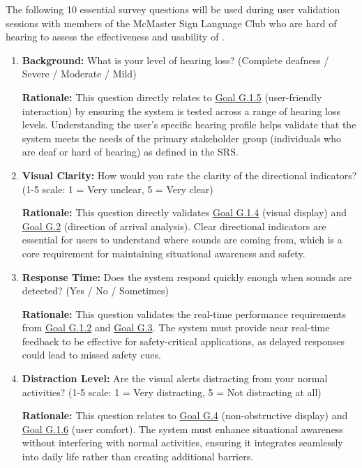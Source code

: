 \documentclass[12pt, titlepage]{article}
\begin{document}
The following 10 essential survey questions will be used during user validation
sessions with members of the McMaster Sign Language Club who are hard of hearing
to assess the effectiveness and usability of .

\begin{enumerate}
    \item \textbf{Background:} What is your level of hearing loss? (Complete
    deafness / Severe / Moderate / Mild)
    
    \textbf{Rationale:} This question directly relates to
    \hyperref[SRS-goal:user_friendly_interaction]{Goal G.1.5} (user-friendly
    interaction) by ensuring the system is tested across a range of hearing loss
    levels. Understanding the user's specific hearing profile helps validate
    that the system meets the needs of the primary stakeholder group
    (individuals who are deaf or hard of hearing) as defined in the SRS.
    
    \item \textbf{Visual Clarity:} How would you rate the clarity of the
    directional indicators? (1-5 scale: 1 = Very unclear, 5 = Very clear)
    
    \textbf{Rationale:} This question directly validates
    \hyperref[SRS-goal:visual_display]{Goal G.1.4} (visual display) and
    \hyperref[SRS-goal:audio_direction_analysis]{Goal G.2} (direction of arrival
    analysis). Clear directional indicators are essential for users to
    understand where sounds are coming from, which is a core requirement for
    maintaining situational awareness and safety.
    
    \item \textbf{Response Time:} Does the system respond quickly enough when
    sounds are detected? (Yes / No / Sometimes)
    
    \textbf{Rationale:} This question validates the real-time performance
    requirements from \hyperref[SRS-goal:audio_direction_analysis]{Goal G.1.2}
    and
    \hyperref[SRS-goal:audio_identification_analysis]{Goal G.3}. The system must
    provide near real-time feedback to be effective for safety-critical
    applications, as delayed responses could lead to missed safety cues.
    
    \item \textbf{Distraction Level:} Are the visual alerts distracting from
    your normal activities? (1-5 scale: 1 = Very distracting, 5 = Not
    distracting at all)
    
    \textbf{Rationale:} This question relates to
    \hyperref[SRS-goal:visual_display]{Goal G.4} (non-obstructive display) and
    \hyperref[SRS-goal:user_comfort]{Goal G.1.6} (user comfort). The system must
    enhance situational awareness without interfering with normal activities,
    ensuring it integrates seamlessly into daily life rather than creating
    additional barriers.
    

\end{enumerate}
\end{document}
